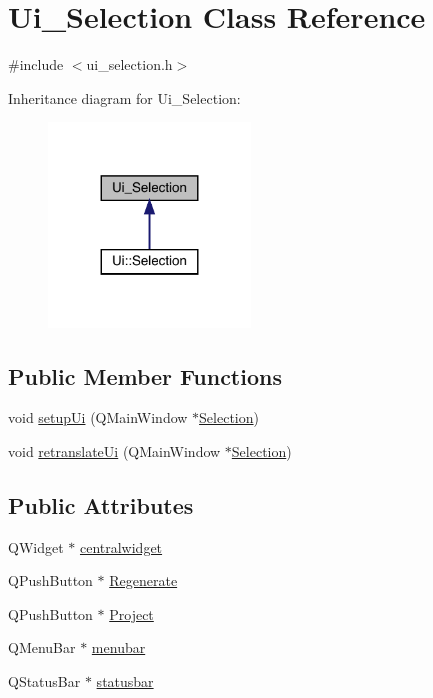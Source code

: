 \hypertarget{class_ui___selection}{}\section{Ui\+\_\+\+Selection Class Reference}
\label{class_ui___selection}


{\ttfamily \#include $<$ui\+\_\+selection.\+h$>$}



Inheritance diagram for Ui\+\_\+\+Selection\+:
\nopagebreak
\begin{figure}[H]
\begin{center}
\leavevmode
\includegraphics[width=152pt]{class_ui___selection__inherit__graph}
\end{center}
\end{figure}
\subsection*{Public Member Functions}
\begin{DoxyCompactItemize}
\item 
void \mbox{\hyperlink{class_ui___selection_a322e6793d2b12efe827615c705a923a2}{setup\+Ui}} (Q\+Main\+Window $\ast$\mbox{\hyperlink{class_selection}{Selection}})
\item 
void \mbox{\hyperlink{class_ui___selection_a2c2db01b357fad240f45ad4c4dc93ad3}{retranslate\+Ui}} (Q\+Main\+Window $\ast$\mbox{\hyperlink{class_selection}{Selection}})
\end{DoxyCompactItemize}
\subsection*{Public Attributes}
\begin{DoxyCompactItemize}
\item 
Q\+Widget $\ast$ \mbox{\hyperlink{class_ui___selection_a16b39d9bb526b0e91c9164f9662ef359}{centralwidget}}
\item 
Q\+Push\+Button $\ast$ \mbox{\hyperlink{class_ui___selection_ac47a6990711035b3b7788619d312b0e3}{Regenerate}}
\item 
Q\+Push\+Button $\ast$ \mbox{\hyperlink{class_ui___selection_aff8310855fc34c39a35996e00c0d1121}{Project}}
\item 
Q\+Menu\+Bar $\ast$ \mbox{\hyperlink{class_ui___selection_a8a7614052678abd3ec8f1cbfeafb280e}{menubar}}
\item 
Q\+Status\+Bar $\ast$ \mbox{\hyperlink{class_ui___selection_a56ba552e01bc7a24e86f5e2fdf0fecbd}{statusbar}}
\end{DoxyCompactItemize}


